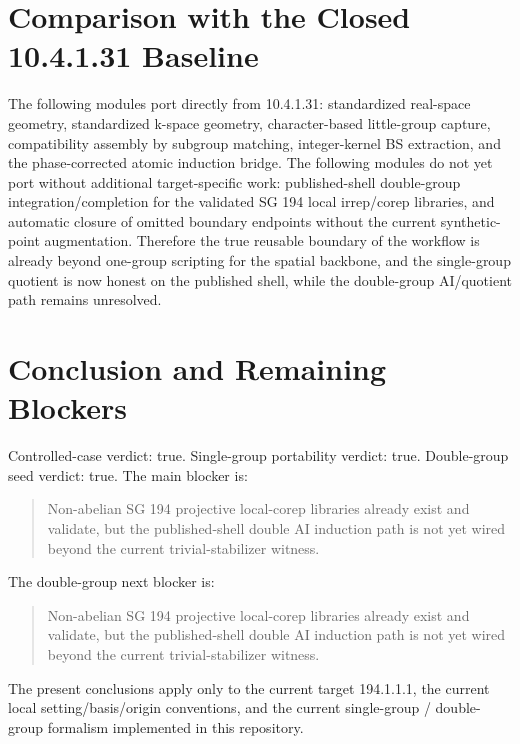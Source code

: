 \documentclass[11pt]{article}
\begin{document}
\section{Comparison with the Closed 10.4.1.31 Baseline}
The following modules port directly from 10.4.1.31: standardized real-space geometry, standardized k-space geometry, character-based little-group capture, compatibility assembly by subgroup matching, integer-kernel BS extraction, and the phase-corrected atomic induction bridge. The following modules do not yet port without additional target-specific work: published-shell double-group integration/completion for the validated SG 194 local irrep/corep libraries, and automatic closure of omitted boundary endpoints without the current synthetic-point augmentation. Therefore the true reusable boundary of the workflow is already beyond one-group scripting for the spatial backbone, and the single-group quotient is now honest on the published shell, while the double-group AI/quotient path remains unresolved.

\section{Conclusion and Remaining Blockers}
Controlled-case verdict: true. Single-group portability verdict: true. Double-group seed verdict: true. The main blocker is:
\begin{quote}
Non-abelian SG 194 projective local-corep libraries already exist and validate, but the published-shell double AI induction path is not yet wired beyond the current trivial-stabilizer witness.
\end{quote}
The double-group next blocker is:
\begin{quote}
Non-abelian SG 194 projective local-corep libraries already exist and validate, but the published-shell double AI induction path is not yet wired beyond the current trivial-stabilizer witness.
\end{quote}
The present conclusions apply only to the current target 194.1.1.1, the current local setting/basis/origin conventions, and the current single-group / double-group formalism implemented in this repository.
\end{document}
